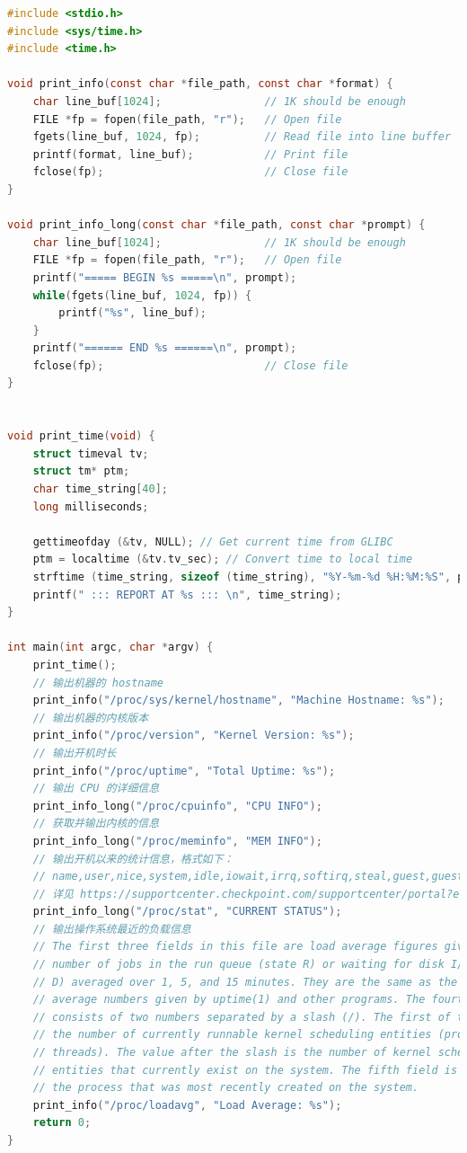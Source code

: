 \documentclass[blue,normal,cn]{elegantnote}
\begin{document}
\begin{lstlisting}[language=C]
#include <stdio.h>
#include <sys/time.h>
#include <time.h>

void print_info(const char *file_path, const char *format) {
    char line_buf[1024];                // 1K should be enough
    FILE *fp = fopen(file_path, "r");   // Open file
    fgets(line_buf, 1024, fp);          // Read file into line buffer
    printf(format, line_buf);           // Print file
    fclose(fp);                         // Close file
}

void print_info_long(const char *file_path, const char *prompt) {
    char line_buf[1024];                // 1K should be enough
    FILE *fp = fopen(file_path, "r");   // Open file
    printf("===== BEGIN %s =====\n", prompt);
    while(fgets(line_buf, 1024, fp)) {
        printf("%s", line_buf);
    }
    printf("====== END %s ======\n", prompt);
    fclose(fp);                         // Close file
}


void print_time(void) {
    struct timeval tv;
    struct tm* ptm;
    char time_string[40];
    long milliseconds;

    gettimeofday (&tv, NULL); // Get current time from GLIBC
    ptm = localtime (&tv.tv_sec); // Convert time to local time
    strftime (time_string, sizeof (time_string), "%Y-%m-%d %H:%M:%S", ptm); // Convert time to human-readable string
    printf(" ::: REPORT AT %s ::: \n", time_string);
}

int main(int argc, char *argv) {
    print_time();
    // 输出机器的 hostname
    print_info("/proc/sys/kernel/hostname", "Machine Hostname: %s");
    // 输出机器的内核版本
    print_info("/proc/version", "Kernel Version: %s");
    // 输出开机时长
    print_info("/proc/uptime", "Total Uptime: %s");
    // 输出 CPU 的详细信息
    print_info_long("/proc/cpuinfo", "CPU INFO");
    // 获取并输出内核的信息
    print_info_long("/proc/meminfo", "MEM INFO");
    // 输出开机以来的统计信息，格式如下：
    // name,user,nice,system,idle,iowait,irrq,softirq,steal,guest,guest_nice
    // 详见 https://supportcenter.checkpoint.com/supportcenter/portal?eventSubmit_doGoviewsolutiondetails=&solutionid=sk65143
    print_info_long("/proc/stat", "CURRENT STATUS");
    // 输出操作系统最近的负载信息
    // The first three fields in this file are load average figures giving the 
    // number of jobs in the run queue (state R) or waiting for disk I/O (state 
    // D) averaged over 1, 5, and 15 minutes. They are the same as the load 
    // average numbers given by uptime(1) and other programs. The fourth field 
    // consists of two numbers separated by a slash (/). The first of these is 
    // the number of currently runnable kernel scheduling entities (processes, 
    // threads). The value after the slash is the number of kernel scheduling 
    // entities that currently exist on the system. The fifth field is the PID of 
    // the process that was most recently created on the system.
    print_info("/proc/loadavg", "Load Average: %s");
    return 0;
}
\end{lstlisting}
\end{document}
